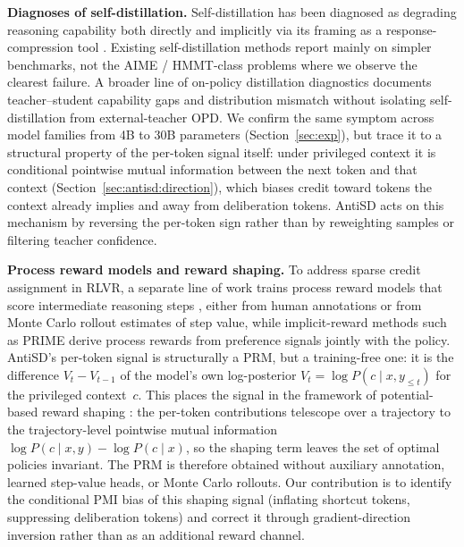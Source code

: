 \documentclass{article}
\begin{document}
\textbf{Diagnoses of self-distillation.}
Self-distillation has been diagnosed as degrading reasoning capability both directly \citep{kim2026does} and implicitly via its framing as a response-compression tool \citep{opsdc}. Existing self-distillation methods \citep{opsd, sdpo, opcd-ye, yang2026rlsd} report mainly on simpler benchmarks, not the AIME / HMMT-class problems where we observe the clearest failure. A broader line of on-policy distillation diagnostics \citep{fu2026revisitingonpolicydistillationempirical, li2026rethinking, li2026unifying, xu2026paceddistillationselfdistillationfrontier} documents teacher--student capability gaps and distribution mismatch without isolating self-distillation from external-teacher OPD. We confirm the same symptom across model families from 4B to 30B parameters (Section~\ref{sec:exp}), but trace it to a structural property of the per-token signal itself: under privileged context it is conditional pointwise mutual information between the next token and that context (Section~\ref{sec:antisd:direction}), which biases credit toward tokens the context already implies and away from deliberation tokens. AntiSD acts on this mechanism by reversing the per-token sign rather than by reweighting samples or filtering teacher confidence.

\textbf{Process reward models and reward shaping.}
To address sparse credit assignment in RLVR, a separate line of work trains process reward models that score intermediate reasoning steps \citep{prm800k, math-shepherd, luo2024improve, setlur2025rewarding, lee2026efficient}, either from human annotations or from Monte Carlo rollout estimates of step value, while implicit-reward methods such as PRIME \citep{cui2025process} derive process rewards from preference signals jointly with the policy. AntiSD's per-token signal is structurally a PRM, but a training-free one: it is the difference $V_t - V_{t-1}$ of the model's own log-posterior $V_t = \log P(c \mid x, y_{\le t})$ for the privileged context~$c$. This places the signal in the framework of potential-based reward shaping \citep{ng1999policy}: the per-token contributions telescope over a trajectory to the trajectory-level pointwise mutual information $\log P(c\mid x,y) - \log P(c\mid x)$, so the shaping term leaves the set of optimal policies invariant. The PRM is therefore obtained without auxiliary annotation, learned step-value heads, or Monte Carlo rollouts. Our contribution is to identify the conditional PMI bias of this shaping signal (inflating shortcut tokens, suppressing deliberation tokens) and correct it through gradient-direction inversion rather than as an additional reward channel.
\end{document}
